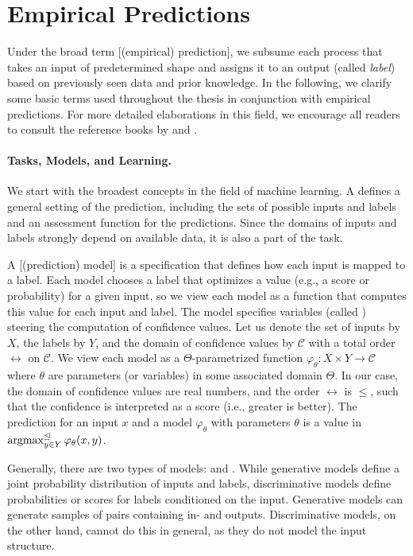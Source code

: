 \documentclass[../document.tex]{subfiles}
\begin{document}
    \section{Empirical Predictions}\label{sec:predictions}
    Under the broad term [(empirical) prediction], we subsume each process that takes an input of predetermined shape and assigns it to an output (called \emph{label}) based on previously seen data and prior knowledge.
    In the following, we clarify some basic terms used throughout the thesis in conjunction with empirical predictions.
    For more detailed elaborations in this field, we encourage all readers to consult the reference books by \citet{Moh12} and \citet{Dau17}.

    \paragraph{Tasks, Models, and Learning.}
    We start with the broadest concepts in the field of machine learning.
    A  defines a general setting of the prediction, including the sets of possible inputs and labels and an assessment function for the predictions.
    Since the domains of inputs and labels strongly depend on available data, it is also a part of the task.

    A [(prediction) model] is a specification that defines how each input is mapped to a label.
    Each model chooses a label that optimizes a  value (e.g., a score or probability) for a given input, so we view each model as a function that computes this value for each input and label.
    The model specifies variables (called ) steering the computation of confidence values.
    Let us denote the set of inputs by \(X\), the labels by \(Y\), and the domain of confidence values by \(\mathcal{C}\) with a total order \(\rel\) on \(\mathcal{C}\).
    We view each model as a \(\varTheta\)-parametrized function \(\varphi_\theta\colon X \times Y \to \mathcal{C}\) where \(\theta\) are parameters (or variables) in some associated domain \(\varTheta\).
    In our case, the domain of confidence values are real numbers, and the order \(\rel\) is \(\leq\), such that the confidence is interpreted as a score (i.e., greater is better).
    The prediction for an input \(x\) and a model \(\varphi_\theta\) with parameters \(\theta\) is a value in \(\operatorname{arg max}^{\mathrel{\unlhd}}_{y \in Y} \varphi_\theta(x, y)\).

    Generally, there are two types of models:  and .
    While generative models define a joint probability distribution of inputs and labels, discriminative models define probabilities or scores for labels conditioned on the input.
    Generative models can generate samples of pairs containing in- and outputs.
    Discriminative models, on the other hand, cannot do this in general, as they do not model the input structure.
\end{document}
